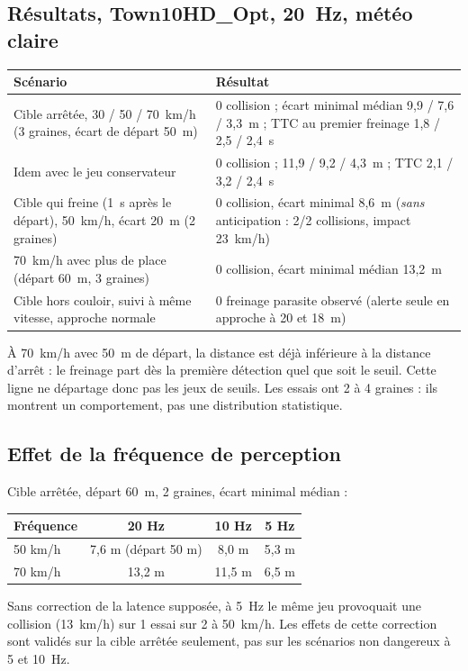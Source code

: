\documentclass[11pt,a4paper]{article}
\begin{document}
\subsection{R\'esultats, Town10HD\_Opt, 20~Hz, m\'et\'eo claire}
\begin{center}\small\begin{tabular}{@{}p{7.3cm}p{8cm}@{}}\toprule
Sc\'enario & R\'esultat \\\midrule
Cible arr\^et\'ee, 30 / 50 / 70~km/h (3 graines, \'ecart de d\'epart 50~m) & 0 collision ; \'ecart minimal m\'edian 9,9 / 7,6 / 3,3~m ; TTC au premier freinage 1,8 / 2,5 / 2,4~s \\
Idem avec le jeu conservateur & 0 collision ; 11,9 / 9,2 / 4,3~m ; TTC 2,1 / 3,2 / 2,4~s \\
Cible qui freine (1~s apr\`es le d\'epart), 50~km/h, \'ecart 20~m (2 graines) & 0 collision, \'ecart minimal 8,6~m (\emph{sans} anticipation : 2/2 collisions, impact 23~km/h) \\
70~km/h avec plus de place (d\'epart 60~m, 3 graines) & 0 collision, \'ecart minimal m\'edian 13,2~m \\
Cible hors couloir, suivi \`a m\^eme vitesse, approche normale & 0 freinage parasite observ\'e (alerte seule en approche \`a 20 et 18~m) \\
\bottomrule\end{tabular}\end{center}
\begin{honnete}
\`A 70~km/h avec 50~m de d\'epart, la distance est d\'ej\`a inf\'erieure \`a la distance d'arr\^et : le freinage part d\`es la premi\`ere d\'etection quel que soit le seuil.
Cette ligne ne d\'epartage donc pas les jeux de seuils. Les essais ont 2 \`a 4 graines : ils montrent un comportement, pas une distribution statistique.
\end{honnete}

\subsection{Effet de la fr\'equence de perception}
Cible arr\^et\'ee, d\'epart 60~m, 2 graines, \'ecart minimal m\'edian :
\begin{center}\small\begin{tabular}{@{}lccc@{}}\toprule
Fr\'equence & 20 Hz & 10 Hz & 5 Hz \\\midrule
50 km/h & 7,6 m (d\'epart 50 m) & 8,0 m & 5,3 m \\
70 km/h & 13,2 m & 11,5 m & 6,5 m \\
\bottomrule\end{tabular}\end{center}
Sans correction de la latence suppos\'ee, \`a 5~Hz le m\^eme jeu provoquait une collision (13~km/h) sur 1 essai sur 2 \`a 50~km/h. Les effets de cette correction sont valid\'es sur la cible arr\^et\'ee
seulement, pas sur les sc\'enarios non dangereux \`a 5 et 10~Hz.
\end{document}
